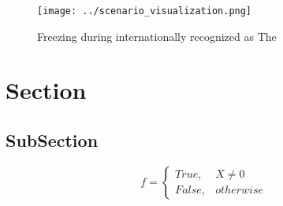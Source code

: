 \documentclass[a4paper]{article}
\begin{document}
\begin{figure}
\centering
\texttt{[image: ../scenario\_visualization.png]}
\caption{Freezing during internationally recognized as The
}
\end{figure}
 
\section{Section}

\subsection{SubSection}

\begin{equation}   f =
\begin{cases} True, & X \neq 0\\
False, & otherwise
\end{cases}
\end{equation}
\end{document}
